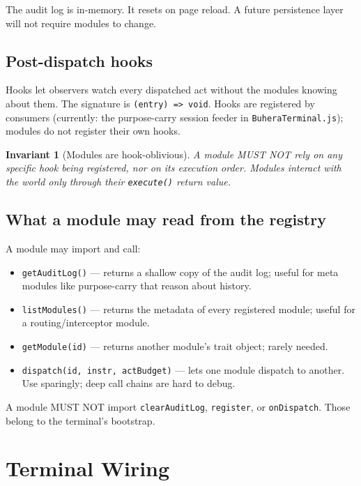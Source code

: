 \documentclass[11pt,a4paper]{article}
\theoremstyle{contract}
\newtheorem{invariant}[contract]{Invariant}
\begin{document}
The audit log is in-memory. It resets on page reload. A future
persistence layer will not require modules to change.

\subsection{Post-dispatch hooks}

Hooks let observers watch every dispatched act without the modules
knowing about them. The signature is \texttt{(entry) => void}. Hooks
are registered by consumers (currently: the purpose-carry session
feeder in \texttt{BuheraTerminal.js}); modules do not register their
own hooks.

\begin{invariant}[Modules are hook-oblivious]
\label{inv:hookoblivious}
A module MUST NOT rely on any specific hook being registered, nor on
its execution order. Modules interact with the world only through their
\texttt{execute()} return value.
\end{invariant}

\subsection{What a module may read from the registry}

A module may import and call:

\begin{itemize}[nosep,leftmargin=1.4em]
\item \texttt{getAuditLog()} --- returns a shallow copy of the audit
log; useful for meta modules like purpose-carry that reason about
history.
\item \texttt{listModules()} --- returns the metadata of every
registered module; useful for a routing/interceptor module.
\item \texttt{getModule(id)} --- returns another module's trait object;
rarely needed.
\item \texttt{dispatch(id, instr, actBudget)} --- lets one module
dispatch to another. Use sparingly; deep call chains are hard to debug.
\end{itemize}

A module MUST NOT import \texttt{clearAuditLog}, \texttt{register}, or
\texttt{onDispatch}. Those belong to the terminal's bootstrap.

\section{Terminal Wiring}
\label{sec:renderer}
\end{document}

